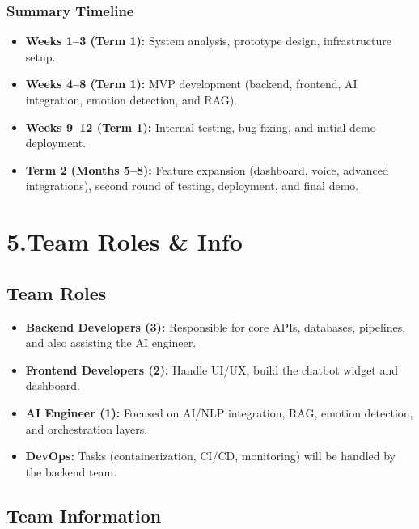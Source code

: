\documentclass[12pt,a4paper]{article}
\begin{document}
\subsubsection*{Summary Timeline}
\begin{itemize}[leftmargin=*]
    \item \textbf{Weeks 1--3 (Term 1):} System analysis, prototype design, infrastructure setup.  
    \item \textbf{Weeks 4--8 (Term 1):} MVP development (backend, frontend, AI integration, emotion detection, and RAG).  
    \item \textbf{Weeks 9--12 (Term 1):} Internal testing, bug fixing, and initial demo deployment.  
    \item \textbf{Term 2 (Months 5--8):} Feature expansion (dashboard, voice, advanced integrations), second round of testing, deployment, and final demo.  
\end{itemize}

\section*{5.Team Roles \& Info}
\subsection*{Team Roles}
\begin{itemize}[leftmargin=*]
    \item \textbf{Backend Developers (3):} Responsible for core APIs, databases, pipelines, and also assisting the AI engineer.  
    \item \textbf{Frontend Developers (2):} Handle UI/UX, build the chatbot widget and dashboard.  
    \item \textbf{AI Engineer (1):} Focused on AI/NLP integration, RAG, emotion detection, and orchestration layers.  
    \item \textbf{DevOps:} Tasks (containerization, CI/CD, monitoring) will be handled by the backend team.  
\end{itemize}

\subsection*{Team Information}
\end{document}

